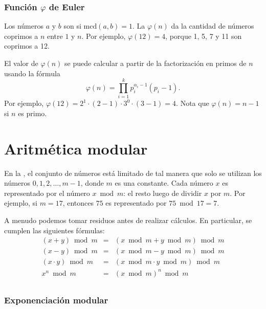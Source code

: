 \subsubsection{Función $\varphi$ de Euler}


Los números $a$ y $b$ son 
si $\textrm{mcd}(a,b)=1$.
La  $\varphi(n)$
da la cantidad de números coprimos a $n$
entre $1$ y $n$.
Por ejemplo, $\varphi(12)=4$,
porque 1, 5, 7 y 11
son coprimos a 12.

El valor de $\varphi(n)$ se puede calcular
a partir de la factorización en primos de $n$
usando la fórmula
\[ \varphi(n) = \prod_{i=1}^k p_i^{\alpha_i-1}(p_i-1). \]
Por ejemplo, $\varphi(12)=2^1 \cdot (2-1) \cdot 3^0 \cdot (3-1)=4$.
Nota que $\varphi(n)=n-1$ si $n$ es primo.

\section{Aritmética modular}


En la ,
el conjunto de números está limitado de tal manera que
solo se utilizan los números $0,1,2,\ldots,m-1$,
donde $m$ es una constante.
Cada número $x$ es
representado por el número $x \bmod m$:
el resto luego de dividir $x$ por $m$.
Por ejemplo, si $m=17$, entonces $75$
es representado por $75 \bmod 17 = 7$.

A menudo podemos tomar residuos antes de realizar
cálculos.
En particular, se cumplen las siguientes fórmulas:
\[
    \begin{array}{rcl}
        (x+y) \bmod m       & = & (x \bmod m + y \bmod m) \bmod m     \\
        (x-y) \bmod m       & = & (x \bmod m - y \bmod m) \bmod m     \\
        (x \cdot y) \bmod m & = & (x \bmod m \cdot y \bmod m) \bmod m \\
        x^n \bmod m         & = & (x \bmod m)^n \bmod m               \\
    \end{array}
\]

\subsubsection{Exponenciación modular}

